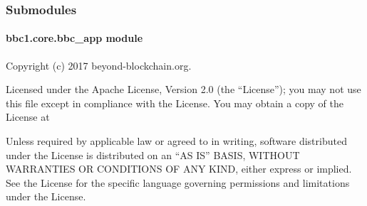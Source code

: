 \documentclass[letterpaper,10pt,english]{sphinxmanual}
\begin{document}
\subsubsection{Submodules}
\label{\detokenize{bbc1.core:submodules}}

\paragraph{bbc1.core.bbc\_app module}
\label{\detokenize{bbc1.core.bbc_app:module-bbc1.core.bbc_app}}\label{\detokenize{bbc1.core.bbc_app::doc}}\label{\detokenize{bbc1.core.bbc_app:bbc1-core-bbc-app-module}}
Copyright (c) 2017 beyond-blockchain.org.

Licensed under the Apache License, Version 2.0 (the “License”);
you may not use this file except in compliance with the License.
You may obtain a copy of the License at
\begin{quote}

\end{quote}

Unless required by applicable law or agreed to in writing, software
distributed under the License is distributed on an “AS IS” BASIS,
WITHOUT WARRANTIES OR CONDITIONS OF ANY KIND, either express or implied.
See the License for the specific language governing permissions and
limitations under the License.
\end{document}
